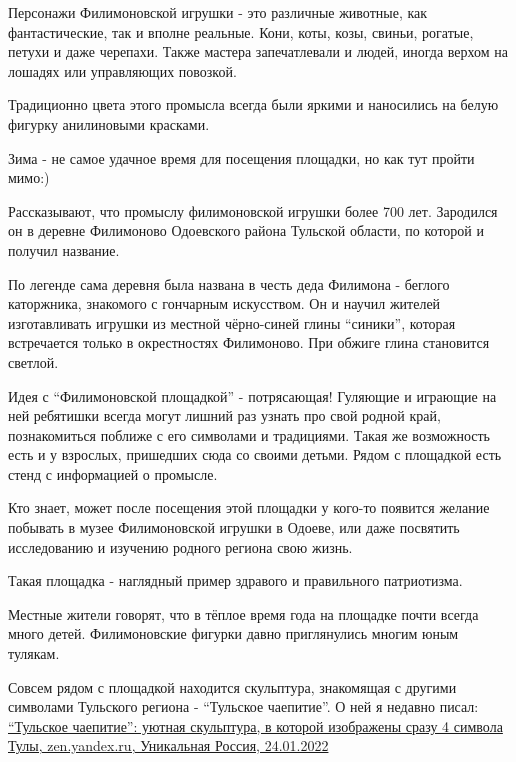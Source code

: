 Персонажи Филимоновской игрушки - это различные животные, как фантастические,
так и вполне реальные. Кони, коты, козы, свиньи, рогатые, петухи и даже
черепахи. Также мастера запечатлевали и людей, иногда верхом на лошадях или
управляющих повозкой.

Традиционно цвета этого промысла всегда были яркими и наносились на белую
фигурку анилиновыми красками. 

Зима - не самое удачное время для посещения площадки, но как тут пройти мимо:)

Рассказывают, что промыслу филимоновской игрушки более 700 лет. Зародился он в
деревне Филимоново Одоевского района Тульской области, по которой и получил
название. 

\begin{zznagolos}
По легенде сама деревня была названа в честь деда Филимона - беглого
каторжника, знакомого с гончарным искусством. Он и научил жителей изготавливать
игрушки из местной чёрно-синей глины \enquote{синики}, которая встречается только в
окрестностях Филимоново. При обжиге глина становится светлой.	
\end{zznagolos}


Идея с \enquote{Филимоновской площадкой} - потрясающая! Гуляющие и играющие на ней
ребятишки всегда могут лишний раз узнать про свой родной край, познакомиться
поближе с его символами и традициями. Такая же возможность есть и у взрослых,
пришедших сюда со своими детьми. Рядом с площадкой есть стенд с информацией о
промысле.

Кто знает, может после посещения этой площадки у кого-то появится желание
побывать в музее Филимоновской игрушки в Одоеве, или даже посвятить
исследованию и изучению родного региона свою жизнь.

Такая площадка - наглядный пример здравого и правильного патриотизма. 

Местные жители говорят, что в тёплое время года на площадке почти всегда много
детей. Филимоновские фигурки давно приглянулись многим юным тулякам.

Совсем рядом с площадкой находится скульптура, знакомящая с другими символами
Тульского региона - \enquote{Тульское чаепитие}. О ней я недавно писал:
\href{https://zen.yandex.ru/media/id/5e52a45be977e25b8eec5de4/tulskoe-chaepitie-uiutnaia-skulptura-v-kotoroi-izobrajeny-srazu-4-simvola-tuly-61edc81c1b287f5c6d20aea5}{%
\enquote{Тульское чаепитие}: уютная скульптура, в которой изображены сразу 4 символа Тулы, %
zen.yandex.ru, Уникальная Россия, 24.01.2022%
}

